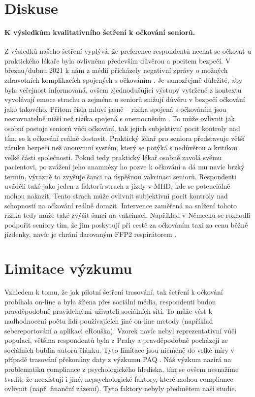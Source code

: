 \section*{Diskuse}

\paragraph*{K výsledkům kvalitativního šetření k očkování seniorů.}
Z výsledků našeho šetření vyplývá, že preference respondentů nechat se očkovat u praktického lékaře byla ovlivněna především důvěrou a pocitem bezpečí. V březnu/dubnu 2021 k nám z médií přicházely negativní zprávy o možných zdravotních komplikacích spojených s očkováním \cite{Svamberk2021,MinisterstvoZdravotnictviCR2021a}. Je samozřejmě důležité, aby byla veřejnost informovaná, ovšem zjednodušující výstupy vytržené z kontextu vyvolávají emoce strachu a zejména u seniorů snižují důvěru v bezpečí očkování jako takového. Přitom čísla mluví jasně – rizika spojená s očkováním jsou nesrovnatelně nižší než rizika spojená s onemocněním \cite{Statniustavprokontroluleciv2021}. 
To může ovlivnit jak osobní postoje seniorů vůči očkování, tak jejich subjektivní pocit kontroly nad tím, se k očkování reálně dostavit. Praktický lékař pro seniora představuje větší záruku bezpečí než anonymní systém, který se potýká s nedůvěrou a kritikou velké části společnosti. Pokud tedy praktický lékař osobně zavolá svému pacientovi, po zvážení jeho anamnézy ho pozve k očkování a dá mu navíc brzký termín, výrazně to zvyšuje šanci na úspěšnou vakcinaci seniorů.
Respondenti uváděli také jako jeden z faktorů strach z jízdy v MHD, kde se potenciálně mohou nakazit. Tento strach může ovlivnit subjektivní pocit kontroly nad schopností na očkování reálně dorazit. Intervence zaměřená na snížení tohoto rizika tedy může také zvýšit šanci na vakcinaci. Například v Německu se rozhodli podpořit seniory tím, že jim poskytují při cestě za očkováním taxi za cenu běžné jízdenky, navíc je chrání darovaným FFP2 respirátorem \cite{Kreijger2021}.

\section*{Limitace výzkumu}

Vzhledem k tomu, že jak pilotní šetření trasování, tak šetření k očkování probíhala on-line a byla šířena přes sociální média, respondenti budou pravděpodobně pravidelnými uživateli sociálních sítí. To může vést k nadhodnocení počtu lidí používajících jiné on-line metody (například sebereportování a aplikaci eRouška). 
Vzorek navíc nebyl reprezentativní vůči populaci, většina respondentů byla z Prahy a pravděpodobně pocházejí ze sociálních bublin autorů článku.
Tyto limitace jsou nicméně do velké míry v případě trasování překonány daty z výzkumu PAQ \cite{Prokop2021a}.
Náš výzkum nazírá na problematiku compliance z psychologického hlediska, tím se ovšem nesnažíme tvrdit, že neexistují i jiné, nepsychologické faktory, které mohou compliance ovlivnit (např. finanční zázemí). Tyto faktory nebyly předmětem naší studie.


